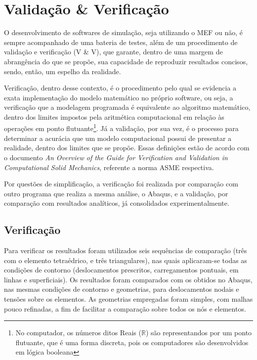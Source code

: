 \chapter{Validação \& Verificação}


O desenvolvimento de softwares de simulação, seja utilizando o MEF ou não, é sempre acompanhado de uma bateria de testes, além de um procedimento de validação e verificação (V \& V), que garante, dentro de uma margem de abrangência do que se propõe, sua capacidade de reproduzir resultados concisos, sendo, então, um espelho da realidade.

Verificação, dentro desse contexto, é o procedimento pelo qual se evidencia a exata implementação do modelo matemático no próprio software, ou seja, a verificação que a modelagem programada é equivalente ao algoritmo matemático, dentro dos limites impostos pela aritmética computacional em relação às operações em ponto flutuante\footnote{No computador, os números ditos Reais ($\mathbb{R}$) são representandos por um ponto flutuante, que é uma forma discreta, pois os computadores são desenvolvidos em lógica booleana}. Já a validação, por sua vez, é o processo para determinar a acurácia que um modelo computacional possui de presentar a realidade, dentro dos limites que se propõe. Essas definições estão de acordo com o documento \emph{An Overview of the Guide for Verification and Validation
in Computational Solid Mechanics}, referente a norma ASME respectiva.

Por questões de simplificação, a verificação foi realizada por comparação com outro programa que realiza a mesma análise, o Abaqus, e a validação, por comparação com resultados analíticos, já consolidados experimentalmente.

\section{Verificação}

Para verificar os resultados foram utilizados seis sequências de comparação (três com o elemento tetraédrico, e três triangulares), nas quais aplicaram-se todas as condições de contorno (deslocamentos prescritos, carregamentos pontuais, em linhas e superficiais). Os resultados foram comparados com os obtidos no Abaqus, nas mesmas condições de contorno e geometrias, para deslocamentos nodais e tensões sobre os elementos. As geometrias empregadas foram simples, com malhas pouco refinadas, a fim de facilitar a comparação sobre todos os nós e elementos.


